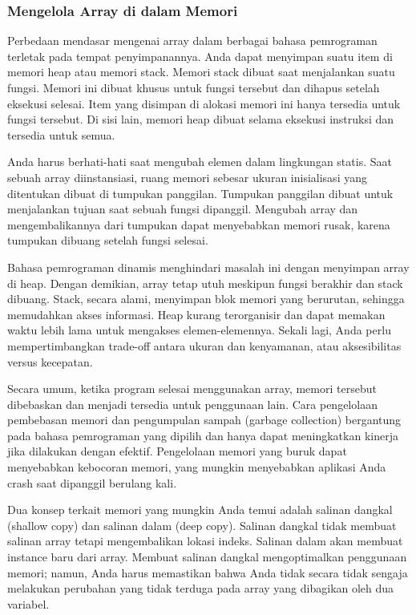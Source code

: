 \documentclass{article}
\begin{document}
\subsubsection{Mengelola Array di dalam Memori}
Perbedaan mendasar mengenai array dalam berbagai bahasa pemrograman terletak pada tempat penyimpanannya. Anda dapat menyimpan suatu item di memori heap atau memori stack. Memori stack dibuat saat menjalankan suatu fungsi. Memori ini dibuat khusus untuk fungsi tersebut dan dihapus setelah eksekusi selesai. Item yang disimpan di alokasi memori ini hanya tersedia untuk fungsi tersebut. Di sisi lain, memori heap dibuat selama eksekusi instruksi dan tersedia untuk semua.

Anda harus berhati-hati saat mengubah elemen dalam lingkungan statis. Saat sebuah array diinstansiasi, ruang memori sebesar ukuran inisialisasi yang ditentukan dibuat di tumpukan panggilan. Tumpukan panggilan dibuat untuk menjalankan tujuan saat sebuah fungsi dipanggil. Mengubah array dan mengembalikannya dari tumpukan dapat menyebabkan memori rusak, karena tumpukan dibuang setelah fungsi selesai.

Bahasa pemrograman dinamis menghindari masalah ini dengan menyimpan array di heap. Dengan demikian, array tetap utuh meskipun fungsi berakhir dan stack dibuang. Stack, secara alami, menyimpan blok memori yang berurutan, sehingga memudahkan akses informasi. Heap kurang terorganisir dan dapat memakan waktu lebih lama untuk mengakses elemen-elemennya. Sekali lagi, Anda perlu mempertimbangkan trade-off antara ukuran dan kenyamanan, atau aksesibilitas versus kecepatan.

Secara umum, ketika program selesai menggunakan array, memori tersebut dibebaskan dan menjadi tersedia untuk penggunaan lain. Cara pengelolaan pembebasan memori dan pengumpulan sampah (garbage collection) bergantung pada bahasa pemrograman yang dipilih dan hanya dapat meningkatkan kinerja jika dilakukan dengan efektif. Pengelolaan memori yang buruk dapat menyebabkan kebocoran memori, yang mungkin menyebabkan aplikasi Anda crash saat dipanggil berulang kali.

Dua konsep terkait memori yang mungkin Anda temui adalah salinan dangkal (shallow copy) dan salinan dalam (deep copy). Salinan dangkal tidak membuat salinan array tetapi mengembalikan lokasi indeks. Salinan dalam akan membuat instance baru dari array. Membuat salinan dangkal mengoptimalkan penggunaan memori; namun, Anda harus memastikan bahwa Anda tidak secara tidak sengaja melakukan perubahan yang tidak terduga pada array yang dibagikan oleh dua variabel.
\end{document}
